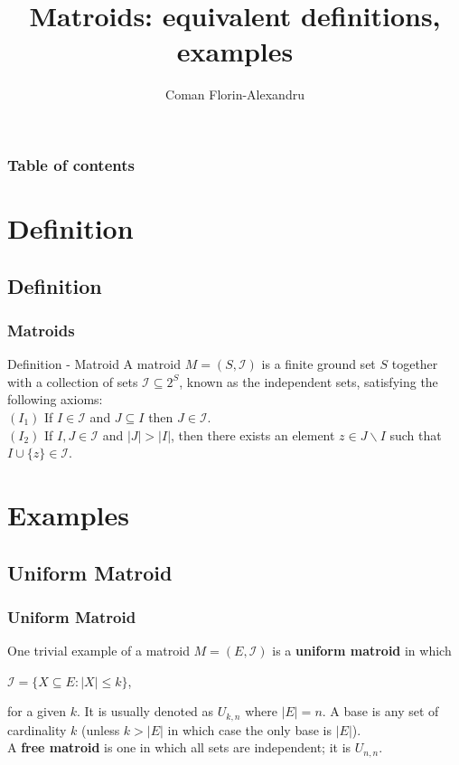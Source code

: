 \documentclass{beamer}
\begin{document}
\title{Matroids: equivalent definitions, examples}  
\author{Coman Florin-Alexandru}

\begin{frame}
\titlepage
\end{frame}

\begin{frame}\frametitle{Table of contents}\tableofcontents
\end{frame}

\section{Definition}
\subsection{Definition}
\begin{frame}\frametitle{Matroids}
\begin{block}{Definition - Matroid}
A matroid $M = (S, \mathcal{I})$ is a finite ground set $S$ together with a collection of sets $\mathcal{I} \subseteq 2^S$, known as the independent sets, satisfying the following axioms: \\
$(I_1)$ If $I \in \mathcal{I}$ and $J \subseteq I$ then $J \in \mathcal{I}.$ \\
$(I_2)$ If $I, J \in \mathcal{I}$ and $|J| > |I|$, then there exists an element $z \in J  \backslash I$ such that $I \cup \lbrace z \rbrace \in \mathcal{I}$.
\end{block}
\end{frame}

\section{Examples}
\subsection{Uniform Matroid}
\begin{frame}\frametitle{Uniform Matroid}
\begin{block}{}
One trivial example of a matroid $M = (E, \mathcal{I})$ is a \textbf{uniform matroid} in which \\
\centerline{$\mathcal{I} = \lbrace X \subseteq E : |X| \leq k \rbrace$,}
for a given $k$. It is usually denoted as $U_{k, n}$ where $|E| = n$. A base is any set of cardinality $k$ (unless $k > |E|$ in which case the only base is $|E|$). \\
A \textbf{free matroid} is one in which all sets are independent; it is $U_{n, n}$.
\end{block}
\end{frame}
\end{document}

